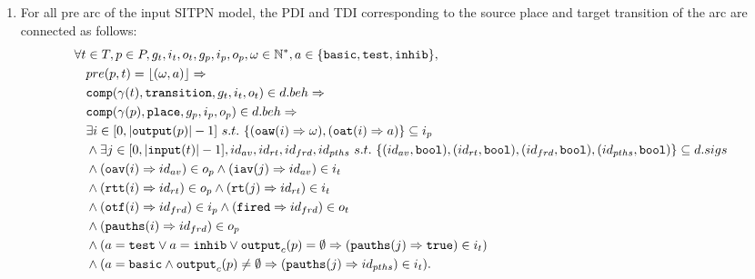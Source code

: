 \begin{definition}
\begin{enumerate}[resume]
  \item For all pre arc of the input SITPN model, the PDI and TDI
    corresponding to the source place and target transition of the arc
    are connected as follows:
    \begin{equation*}
      \begin{aligned}[t]
        \forall{}t&\in{}T,p\in{}P,g_t,i_t,o_t,g_p,i_p,o_p,\omega\in\mathbb{N}^{*},a\in\{\mathtt{basic},\mathtt{test},\mathtt{inhib}\}, \\
                  & pre(p,t)=\lfloor(\omega,a)\rfloor\Rightarrow \\
                  & \mathtt{comp}(\gamma(t),\mathtt{transition},g_t,i_t,o_t)\in{}d.beh\Rightarrow \\
                  & \mathtt{comp}(\gamma(p),\mathtt{place},g_p,i_p,o_p)\in{}d.beh\Rightarrow\\
                  & \exists{}i\in[0,\vert\mathtt{output}(p)\vert-1]~s.t.~\{(\mathtt{oaw}(i)\Rightarrow\omega),(\mathtt{oat}(i)\Rightarrow{}a)\}\subseteq{}i_p \\
                  & \land\exists{}j\in[0,\vert\mathtt{input}(t)\vert-1],id_{av},id_{rt},id_{frd},id_{pths}~s.t.~\{(id_{av},\mathtt{bool}),(id_{rt},\mathtt{bool}),(id_{frd},\mathtt{bool}),(id_{pths},\mathtt{bool})\}\subseteq{}d.sigs \\
                  & \land(\mathtt{oav}(i)\Rightarrow{}id_{av})\in{}o_p\land(\mathtt{iav}(j)\Rightarrow{}id_{av})\in{}i_t \\
                  & \land(\mathtt{rtt}(i)\Rightarrow{}id_{rt})\in{}o_p\land(\mathtt{rt}(j)\Rightarrow{}id_{rt})\in{}i_t \\
                  & \land(\mathtt{otf}(i)\Rightarrow{}id_{frd})\in{}i_p\land(\mathtt{fired}\Rightarrow{}id_{frd})\in{}o_t \\
                  & \land(\mathtt{pauths}(i)\Rightarrow{}id_{frd})\in{}o_p \\
                  & \land(a=\mathtt{test}\lor{}a=\mathtt{inhib}\lor{}\mathtt{output}_c(p)=\emptyset\Rightarrow(\mathtt{pauths}(j)\Rightarrow\mathtt{true})\in{}i_t) \\
                  & \land(a=\mathtt{basic}\land{}\mathtt{output}_c(p)\neq\emptyset\Rightarrow(\mathtt{pauths}(j)\Rightarrow{}id_{pths})\in{}i_t). \\
      \end{aligned}
    \end{equation*}


\end{enumerate}
\end{definition}
